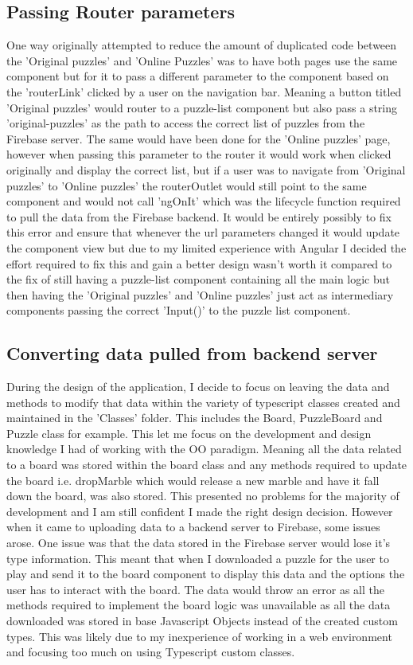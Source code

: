 \documentclass{l4proj}
\begin{document}
\subsection{Passing Router parameters}
One way originally attempted to reduce the amount of duplicated code between the 'Original puzzles' and 'Online Puzzles' was to have both pages use the same component but for it to pass a different parameter to the component based on the 'routerLink' clicked by a user on the navigation bar. Meaning a button titled 'Original puzzles' would router to a puzzle-list component but also pass a string 'original-puzzles' as the path to access the correct list of puzzles from the Firebase server. The same would have been done for the 'Online puzzles' page, however when passing this parameter to the router it would work when clicked originally and display the correct list, but if a user was to navigate from 'Original puzzles' to 'Online puzzles' the routerOutlet would still point to the same component and would not call 'ngOnIt' which was the lifecycle function required to pull the data from the Firebase backend. It would be entirely possibly to fix this error and ensure that whenever the url parameters changed it would update the component view but due to my limited experience with Angular I decided the effort required to fix this and gain a better design wasn't worth it compared to the fix of still having a puzzle-list component containing all the main logic but then having the 'Original puzzles' and 'Online puzzles' just act as intermediary components passing the correct 'Input()' to the puzzle list component. 

\subsection{Converting data pulled from backend server}

During the design of the application, I decide to focus on leaving the data and methods to modify that data within the variety of typescript classes created and maintained in the 'Classes' folder. This includes the Board, PuzzleBoard and Puzzle class for example. This let me focus on the development and design knowledge I had of working with the OO paradigm. Meaning all the data related to a board was stored within the board class and any methods required to update the board i.e. dropMarble which would release a new marble and have it fall down the board, was also stored. This presented no problems for the majority of development and I am still confident I made the right design decision. However when it came to uploading data to a backend server to Firebase, some issues arose. One issue was that the data stored in the Firebase server would lose it's type information. This meant that when I downloaded a puzzle for the user to play and send it to the board component to display this data and the options the user has to interact with the board. The data would throw an error as all the methods required to implement the board logic was unavailable as all the data downloaded was stored in base Javascript Objects instead of the created custom types. This was likely due to my inexperience of working in a web environment and focusing too much on using Typescript custom classes.
\end{document}

